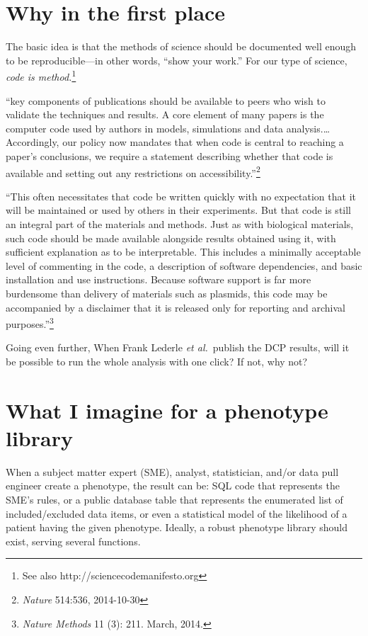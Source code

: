 \documentclass{tufte-handout}
\begin{document}
\section{Why in the first place}

The basic idea is that the methods of science should be documented
well enough to be reproducible---in other words, ``show your work.''
For our type of science, \emph{code is method.}\footnote{See also
http://sciencecodemanifesto.org}

``key components of publications should be available to peers who wish
to validate the techniques and results. A core element of many papers
is the computer code used by authors in models, simulations and data
analysis.\ldots{} Accordingly, our policy now mandates that when code
is central to reaching a paper's conclusions, we require a statement
describing whether that code is available and setting out any
restrictions on accessibility.''\footnote{\emph{Nature} 514:536,
  2014-10-30}

``This often necessitates that code be written quickly with no
expectation that it will be maintained or used by others in their
experiments. But that code is still an integral part of the materials
and methods. Just as with biological materials, such code should be
made available alongside results obtained using it, with sufficient
explanation as to be interpretable. This includes a minimally
acceptable level of commenting in the code, a description of software
dependencies, and basic installation and use instructions. Because
software support is far more burdensome than delivery of materials
such as plasmids, this code may be accompanied by a disclaimer that it
is released only for reporting and archival
purposes.''\footnote{\emph{Nature Methods} 11 (3): 211. March, 2014.}

Going even further, When Frank Lederle \emph{et al.}\ publish the DCP
results, will it be possible to run the whole analysis with one click?
If not, why not?

\section{What I imagine for a phenotype library}

When a subject matter expert (SME), analyst, statistician, and/or data
pull engineer create a phenotype, the result can be: SQL code that
represents the SME's rules, or a public database table that represents
the enumerated list of included/excluded data items, or even a
statistical model of the likelihood of a patient having the given
phenotype. Ideally, a robust phenotype library should exist, serving
several functions.
\end{document}
